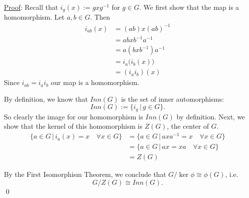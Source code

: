 \documentclass{article}
\begin{document}
\underline{Proof}: Recall that $i_g(x) := gxg^{-1}$ for $g \in G$. We first show that the map is a homomorphism. Let $a, b \in G$. Then
\begin{align*}
	i_{ab}(x) &= (ab)x(ab)^{-1} \\
	&= abxb^{-1}a^{-1} \\
	&= a(bxb^{-1})a^{-1} \\
	&= i_a\big(i_b(x)\big) \\
	&= (i_ai_b)(x)
\end{align*}
Since $i_{ab} = i_ai_b$ our map is a homomorphism.

By definition, we know that $Inn(G)$ is the set of inner automorphisms:
$$Inn(G) := \{ i_g \, \vert \, g \in G \}.$$
So clearly the image for our homomorphism is $Inn(G)$ by definition. Next, we show that the kernel of this homomorphism is $Z(G)$, the center of $G$.
\begin{align*}
	\{ a \in G \, \vert \, i_a(x) = x \quad \forall x \in G \} &= \{  a \in G \, \vert \, axa^{-1} = x \quad \forall x \in G \} \\
	&=  \{  a \in G \, \vert \, ax = xa \quad \forall x \in G \} \\
	&= Z(G)
\end{align*}

By the First Isomorphism Theorem, we conclude that $G/\ker \phi \cong \phi(G)$, i.e.
$$G/Z(G) \cong Inn(G).$$ \qed \\
\end{document}
